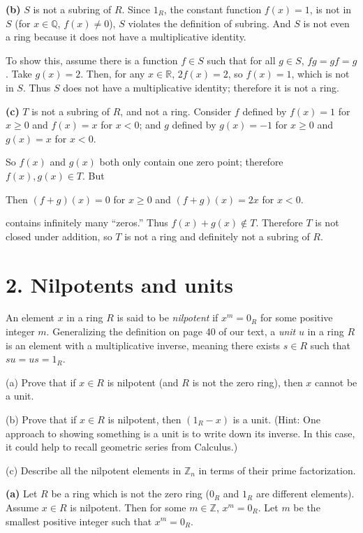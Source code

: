 \textbf{(b)} \(S\) is not a subring of \(R\). Since \(1_{R}\), the constant function \(f(x) = 1\), is not in \(S\) (for \(x \in \mathbb{Q}\), \(f(x) \neq 0\)), \(S\) violates the definition of subring. And \(S\) is not even a ring because it does not have a multiplicative identity.

To show this, assume there is a function \(f \in S\) such that for all \(g \in S\), \(fg = gf = g\). Take \(g(x) = 2\). Then, for any \(x \in \mathbb{R}\), \(2f(x) = 2\), so \(f(x) = 1\), which is not in \(S\). Thus \(S\) does not have a multiplicative identity; therefore it is not a ring.

\textbf{(c)} \(T\) is not a subring of \(R\), and not a ring. Consider \(f\) defined by \(f(x) = 1\) for \(x \geq 0\) and \(f(x) = x\) for \(x < 0\); and \(g\) defined by \(g(x) = - 1\) for \(x \geq 0\) and \(g(x) = x\) for \(x < 0\).

So \(f(x)\) and \(g(x)\) both only contain one zero point; therefore \(f(x),g(x) \in T\). But

Then \(\left( {f + g} \right)(x) = 0\) for \(x \geq 0\) and \(\left( {f + g} \right)(x) = 2x\) for \(x < 0\).

contains infinitely many ``zeros.'' Thus \(f(x) + g(x) \notin T\). Therefore \(T\) is not closed under addition, so \(T\) is not a ring and definitely not a subring of \(R\).

\section{2. Nilpotents and units}

An element \(x\) in a ring \(R\) is said to be \emph{nilpotent} if \(x^{m} = 0_{R}\) for some positive integer \(m\). Generalizing the definition on page 40 of our text, a \emph{unit} \(u\) in a ring \(R\) is an element with a multiplicative inverse, meaning there exists \(s \in R\) such that \(su = us = 1_{R}\).

(a) Prove that if \(x \in R\) is nilpotent (and \(R\) is not the zero ring), then \(x\) cannot be a unit.

(b) Prove that if \(x \in R\) is nilpotent, then \(\left( {1_{R} - x} \right)\) is a unit. (Hint: One approach to showing something is a unit is to write down its inverse. In this case, it could help to recall geometric series from Calculus.)

(c) Describe all the nilpotent elements in \(\mathbb{Z}_{n}\) in terms of their prime factorization.

\textbf{(a)} Let \(R\) be a ring which is not the zero ring (\(0_{R}\) and \(1_{R}\) are different elements). Assume \(x \in R\) is nilpotent. Then for some \(m \in \mathbb{Z}\), \(x^{m} = 0_{R}\). Let \(m\) be the smallest positive integer such that \(x^{m} = 0_{R}\).

